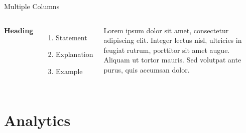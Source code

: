 \documentclass[aspectratio=169,xcolor=dvipsnames]{beamer}
\begin{document}

\begin{frame}{Multiple Columns}
	\begin{columns}[c] %

		\textbf{Heading}
		\begin{enumerate}
			\item Statement
			\item Explanation
			\item Example
		\end{enumerate}

		Lorem ipsum dolor sit amet, consectetur adipiscing elit. Integer lectus nisl, ultricies in feugiat rutrum, porttitor sit amet augue. Aliquam ut tortor mauris. Sed volutpat ante purus, quis accumsan dolor.

	\end{columns}
\end{frame}

\section{Analytics}
\end{document}
